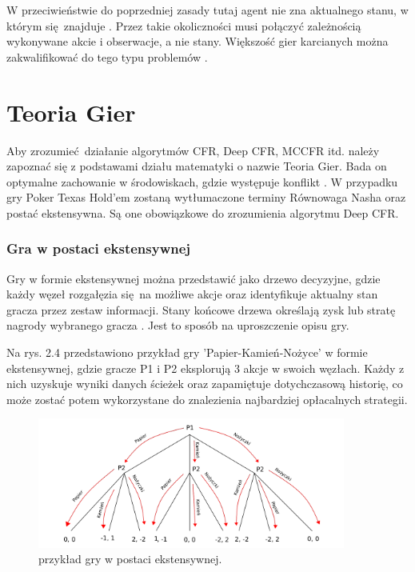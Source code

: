 \documentclass[12pt,oneside,a4paper]{report}
\begin{document}
\vspace{2cm}
W przeciwieństwie do poprzedniej zasady tutaj agent nie zna aktualnego stanu, w którym
się znajduje \cite{mdp}. Przez takie okoliczności musi połączyć zależnością wykonywane akcie i
obserwacje, a nie stany. Większość gier karcianych można zakwalifikować do tego typu problemów
\cite{mdp}.

\section{Teoria Gier}

Aby zrozumieć działanie algorytmów CFR, Deep CFR, MCCFR itd. należy zapoznać się
z podstawami działu matematyki o nazwie Teoria Gier. Bada on optymalne zachowanie w środowiskach, gdzie
występuje konflikt \cite{gt}. W przypadku gry Poker Texas
Hold'em zostaną wytłumaczone terminy Równowaga Nasha oraz
postać ekstensywna. Są one obowiązkowe do zrozumienia algorytmu Deep CFR.

\subsubsection{Gra w postaci ekstensywnej}

Gry w
formie ekstensywnej można przedstawić jako drzewo decyzyjne, gdzie każdy węzeł rozgałęzia się na
możliwe akcje oraz identyfikuje aktualny stan gracza przez zestaw informacji.
Stany końcowe drzewa określają zysk lub stratę nagrody wybranego gracza \cite{gt}.
Jest to sposób
na uproszczenie opisu gry.

Na rys. 2.4 przedstawiono przykład gry 'Papier-Kamień-Nożyce' w formie ekstensywnej, gdzie gracze P1 i
P2 eksplorują 3 akcje w swoich węzłach. 
Każdy z nich uzyskuje wyniki danych ścieżek oraz zapamiętuje dotychczasową historię, co może zostać potem
wykorzystane do znalezienia najbardziej opłacalnych strategii.

\begin{figure}[th!]
            \center
           \includegraphics[width=0.9\textwidth]{./img/drawing1.pdf}
           \caption{przykład gry w postaci ekstensywnej.}
\end{figure}
\end{document}
